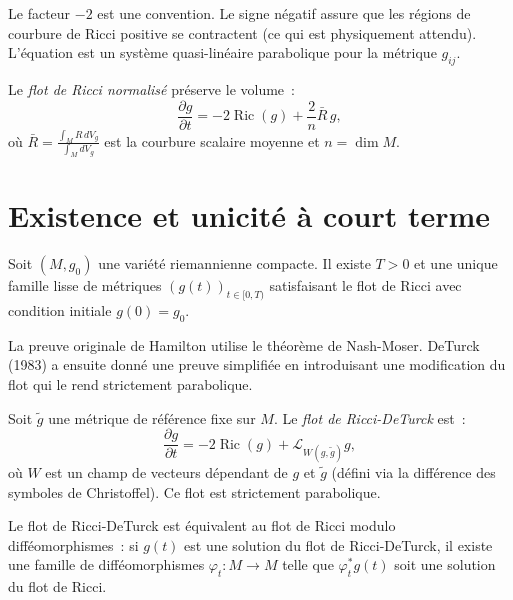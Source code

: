 \begin{remarque}
Le facteur $-2$ est une convention. Le signe n\'egatif assure que les r\'egions de
courbure de Ricci positive se contractent (ce qui est physiquement attendu).
L'\'equation est un syst\`eme quasi-lin\'eaire parabolique pour la m\'etrique $g_{ij}$.
\end{remarque}

\begin{definition}
Le \emph{flot de Ricci normalis\'e} pr\'eserve le volume~:
\[
    \frac{\partial g}{\partial t} = -2\operatorname{Ric}(g) + \frac{2}{n}\bar{R}\, g,
\]
o\`u $\bar{R} = \frac{\int_M R\, dV_g}{\int_M dV_g}$ est la courbure scalaire moyenne
et $n = \dim M$.
\end{definition}

\section{Existence et unicit\'e \`a court terme}

\begin{theoreme}[Hamilton, 1982]
\label{thm:hamilton_existence}
Soit $(M, g_0)$ une vari\'et\'e riemannienne compacte. Il existe $T > 0$ et une
unique famille lisse de m\'etriques $(g(t))_{t \in [0, T)}$ satisfaisant le flot de Ricci
avec condition initiale $g(0) = g_0$.
\end{theoreme}

\begin{remarque}
La preuve originale de Hamilton utilise le th\'eor\`eme de Nash-Moser. DeTurck (1983)
a ensuite donn\'e une preuve simplifi\'ee en introduisant une modification du flot
qui le rend strictement parabolique.
\end{remarque}

\begin{definition}
Soit $\tilde{g}$ une m\'etrique de r\'ef\'erence fixe sur $M$. Le \emph{flot de
Ricci-DeTurck} est~:
\[
    \frac{\partial g}{\partial t} = -2\operatorname{Ric}(g)
    + \mathcal{L}_{W(g, \tilde{g})} g,
\]
o\`u $W$ est un champ de vecteurs d\'ependant de $g$ et $\tilde{g}$ (d\'efini via
la diff\'erence des symboles de Christoffel). Ce flot est strictement parabolique.
\end{definition}

\begin{proposition}
Le flot de Ricci-DeTurck est \'equivalent au flot de Ricci modulo diff\'eomorphismes~:
si $g(t)$ est une solution du flot de Ricci-DeTurck, il existe une famille de
diff\'eomorphismes $\varphi_t : M \to M$ telle que $\varphi_t^* g(t)$ soit une solution
du flot de Ricci.
\end{proposition}

